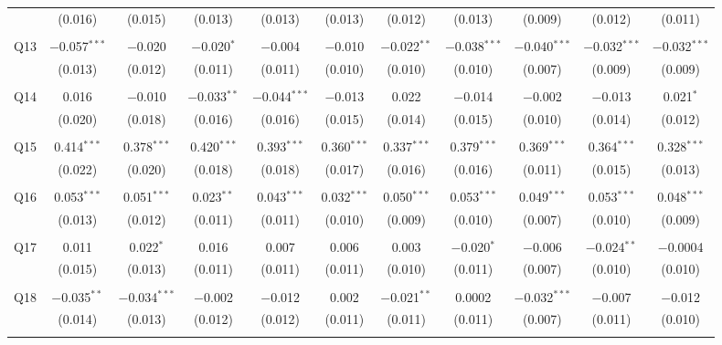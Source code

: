 \documentclass[11pt,a4paper]{report}
\begin{document}
\begin{table}
\begin{tabular}{@{\extracolsep{8pt}}lcccccccccc}
	& (0.016) & (0.015) & (0.013) & (0.013) & (0.013) & (0.012) & (0.013) & (0.009) & (0.012) & (0.011) \\ 
	& & & & & & & & & & \\ 
	Q13 & $-$0.057$^{***}$ & $-$0.020 & $-$0.020$^{*}$ & $-$0.004 & $-$0.010 & $-$0.022$^{**}$ & $-$0.038$^{***}$ & $-$0.040$^{***}$ & $-$0.032$^{***}$ & $-$0.032$^{***}$ \\ 
	& (0.013) & (0.012) & (0.011) & (0.011) & (0.010) & (0.010) & (0.010) & (0.007) & (0.009) & (0.009) \\ 
	& & & & & & & & & & \\ 
	Q14 & 0.016 & $-$0.010 & $-$0.033$^{**}$ & $-$0.044$^{***}$ & $-$0.013 & 0.022 & $-$0.014 & $-$0.002 & $-$0.013 & 0.021$^{*}$ \\ 
	& (0.020) & (0.018) & (0.016) & (0.016) & (0.015) & (0.014) & (0.015) & (0.010) & (0.014) & (0.012) \\ 
	& & & & & & & & & & \\ 
	Q15 & 0.414$^{***}$ & 0.378$^{***}$ & 0.420$^{***}$ & 0.393$^{***}$ & 0.360$^{***}$ & 0.337$^{***}$ & 0.379$^{***}$ & 0.369$^{***}$ & 0.364$^{***}$ & 0.328$^{***}$ \\ 
	& (0.022) & (0.020) & (0.018) & (0.018) & (0.017) & (0.016) & (0.016) & (0.011) & (0.015) & (0.013) \\ 
	& & & & & & & & & & \\ 
	Q16 & 0.053$^{***}$ & 0.051$^{***}$ & 0.023$^{**}$ & 0.043$^{***}$ & 0.032$^{***}$ & 0.050$^{***}$ & 0.053$^{***}$ & 0.049$^{***}$ & 0.053$^{***}$ & 0.048$^{***}$ \\ 
	& (0.013) & (0.012) & (0.011) & (0.011) & (0.010) & (0.009) & (0.010) & (0.007) & (0.010) & (0.009) \\ 
	& & & & & & & & & & \\ 
	Q17 & 0.011 & 0.022$^{*}$ & 0.016 & 0.007 & 0.006 & 0.003 & $-$0.020$^{*}$ & $-$0.006 & $-$0.024$^{**}$ & $-$0.0004 \\ 
	& (0.015) & (0.013) & (0.011) & (0.011) & (0.011) & (0.010) & (0.011) & (0.007) & (0.010) & (0.010) \\ 
	& & & & & & & & & & \\ 
	Q18 & $-$0.035$^{**}$ & $-$0.034$^{***}$ & $-$0.002 & $-$0.012 & 0.002 & $-$0.021$^{**}$ & 0.0002 & $-$0.032$^{***}$ & $-$0.007 & $-$0.012 \\ 
	& (0.014) & (0.013) & (0.012) & (0.012) & (0.011) & (0.011) & (0.011) & (0.007) & (0.011) & (0.010) \\ 
	& & & & & & & & & & \\ 

\end{tabular}
\end{table}
\end{document}
